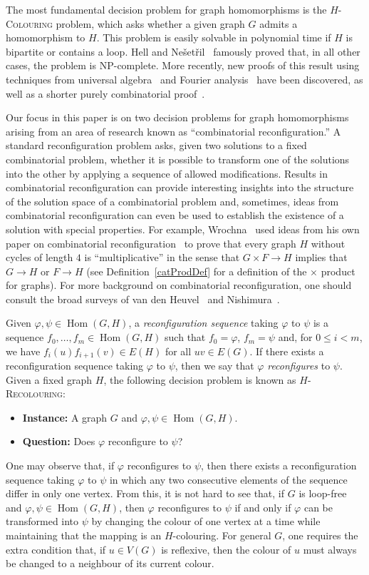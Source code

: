 \documentclass[11 pt]{amsart}
\theoremstyle{definition}
\theoremstyle{case}
\numberwithin{equation}{section}
\newcommand\Hcol[1]{\textsc{$#1$-Colouring}}
\newcommand\Hrec[1]{\textsc{$#1$-Recolouring}}
\newcommand{\Hom}{\operatorname{Hom}}
\begin{document}
The most fundamental decision problem for graph homomorphisms is the \Hcol{H} problem, which asks whether a given graph $G$ admits a homomorphism to $H$. This problem is easily solvable in polynomial time if $H$ is bipartite or contains a loop. Hell and Ne\v{s}et\v{r}il~\cite{Hcol} famously proved that, in all other cases, the problem is NP-complete. More recently, new proofs of this result using techniques from universal algebra~\cite{Bulatov} and Fourier analysis~\cite{KunSzegedy} have been discovered, as well as a shorter purely combinatorial proof~\cite{Siggers}.

Our focus in this paper is on two decision problems for graph homomorphisms arising from an area of research known as ``combinatorial reconfiguration.'' A standard reconfiguration problem asks, given two solutions to a fixed combinatorial problem, whether it is possible to transform one of the solutions into the other by applying a sequence of allowed modifications. Results in combinatorial reconfiguration can provide interesting insights into the structure of the solution space of a combinatorial problem and, sometimes, ideas from combinatorial reconfiguration can even be used to establish the existence of a solution with special properties. For example, Wrochna~\cite{WrochnaMult} used ideas from his own paper on combinatorial reconfiguration~\cite{Wrochna} to prove that every graph $H$ without cycles of length $4$ is ``multiplicative'' in the sense that $G\times F\to H$ implies that $G\to H$ or $F\to H$ (see Definition~\ref{catProdDef} for a definition of the $\times$ product for graphs). For more background on combinatorial reconfiguration, one should consult the broad surveys of van den Heuvel~\cite{changeSurvey} and Nishimura~\cite{Nishimura}. 

Given $\varphi,\psi\in \Hom(G,H)$, a \emph{reconfiguration sequence} taking $\varphi$ to $\psi$ is a sequence $f_0,\dots,f_m\in \Hom(G,H)$ such that $f_0=\varphi$, $f_m=\psi$ and, for $0\leq i< m$, we have $f_i(u)f_{i+1}(v)\in E(H)$ for all $uv\in E(G)$. If there exists a reconfiguration sequence taking $\varphi$ to $\psi$, then we say that $\varphi$ \emph{reconfigures} to $\psi$. Given a fixed graph $H$, the following decision problem is known as \Hrec{H}:
\begin{itemize}
\item[] \textbf{Instance:} A graph $G$ and $\varphi,\psi\in \Hom(G,H)$.
\item[] \textbf{Question:} Does $\varphi$ reconfigure to $\psi$?
\end{itemize}
One may observe that, if $\varphi$ reconfigures to $\psi$, then there exists a reconfiguration sequence  taking $\varphi$ to $\psi$ in which any two consecutive elements of the sequence differ in only one vertex. From this, it is not hard to see that, if $G$ is loop-free and $\varphi,\psi\in\Hom(G,H)$, then $\varphi$ reconfigures to $\psi$ if and only if $\varphi$ can be transformed into $\psi$ by changing the colour of one vertex at a time while maintaining that the mapping is an $H$-colouring. For general $G$, one requires the extra condition that, if $u\in V(G)$ is reflexive, then the colour of $u$ must always be changed to a neighbour of its current colour. 
\end{document}
